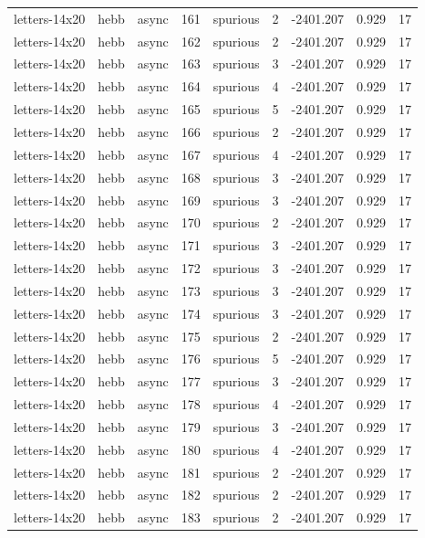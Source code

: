 \begin{tabular}{lllrlrrrr}
letters-14x20 & hebb & async & 161 & spurious & 2 & -2401.207 & 0.929 & 17 \\
letters-14x20 & hebb & async & 162 & spurious & 2 & -2401.207 & 0.929 & 17 \\
letters-14x20 & hebb & async & 163 & spurious & 3 & -2401.207 & 0.929 & 17 \\
letters-14x20 & hebb & async & 164 & spurious & 4 & -2401.207 & 0.929 & 17 \\
letters-14x20 & hebb & async & 165 & spurious & 5 & -2401.207 & 0.929 & 17 \\
letters-14x20 & hebb & async & 166 & spurious & 2 & -2401.207 & 0.929 & 17 \\
letters-14x20 & hebb & async & 167 & spurious & 4 & -2401.207 & 0.929 & 17 \\
letters-14x20 & hebb & async & 168 & spurious & 3 & -2401.207 & 0.929 & 17 \\
letters-14x20 & hebb & async & 169 & spurious & 3 & -2401.207 & 0.929 & 17 \\
letters-14x20 & hebb & async & 170 & spurious & 2 & -2401.207 & 0.929 & 17 \\
letters-14x20 & hebb & async & 171 & spurious & 3 & -2401.207 & 0.929 & 17 \\
letters-14x20 & hebb & async & 172 & spurious & 3 & -2401.207 & 0.929 & 17 \\
letters-14x20 & hebb & async & 173 & spurious & 3 & -2401.207 & 0.929 & 17 \\
letters-14x20 & hebb & async & 174 & spurious & 3 & -2401.207 & 0.929 & 17 \\
letters-14x20 & hebb & async & 175 & spurious & 2 & -2401.207 & 0.929 & 17 \\
letters-14x20 & hebb & async & 176 & spurious & 5 & -2401.207 & 0.929 & 17 \\
letters-14x20 & hebb & async & 177 & spurious & 3 & -2401.207 & 0.929 & 17 \\
letters-14x20 & hebb & async & 178 & spurious & 4 & -2401.207 & 0.929 & 17 \\
letters-14x20 & hebb & async & 179 & spurious & 3 & -2401.207 & 0.929 & 17 \\
letters-14x20 & hebb & async & 180 & spurious & 4 & -2401.207 & 0.929 & 17 \\
letters-14x20 & hebb & async & 181 & spurious & 2 & -2401.207 & 0.929 & 17 \\
letters-14x20 & hebb & async & 182 & spurious & 2 & -2401.207 & 0.929 & 17 \\
letters-14x20 & hebb & async & 183 & spurious & 2 & -2401.207 & 0.929 & 17 \\

\end{tabular}
